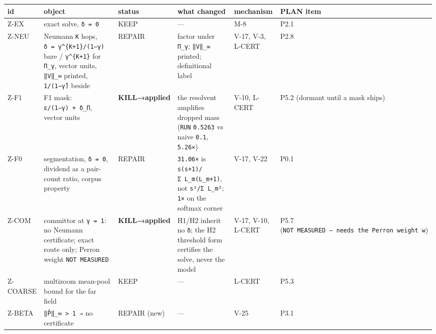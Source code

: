 \documentclass[11pt,a4paper]{article}
\newcounter{none}                 %
\theoremstyle{plain}
\theoremstyle{definition}
\theoremstyle{remark}
\begin{document}
{\def\LTcaptype{none} %
\begin{longtable}[]{@{}
  >{\raggedright\arraybackslash}p{}
  >{\raggedright\arraybackslash}p{}
  >{\raggedright\arraybackslash}p{}
  >{\raggedright\arraybackslash}p{}
  >{\raggedright\arraybackslash}p{}
  >{\raggedright\arraybackslash}p{}@{}}
\toprule\noalign{}
\begin{minipage}[b]{\linewidth}\raggedright
id
\end{minipage} & \begin{minipage}[b]{\linewidth}\raggedright
object
\end{minipage} & \begin{minipage}[b]{\linewidth}\raggedright
status
\end{minipage} & \begin{minipage}[b]{\linewidth}\raggedright
what changed
\end{minipage} & \begin{minipage}[b]{\linewidth}\raggedright
mechanism
\end{minipage} & \begin{minipage}[b]{\linewidth}\raggedright
PLAN item
\end{minipage} \\
\midrule\noalign{}
\endhead
\bottomrule\noalign{}
\endlastfoot
Z-EX & exact solve, \texttt{δ\ =\ 0} & KEEP & --- & M-8 & P2.1 \\
Z-NEU & Neumann \texttt{K} hops, \texttt{δ\ =\ γ\^{}\{K+1\}/(1−γ)} bare
/ \texttt{γ\^{}\{K+1\}} for \texttt{Π\_γ}, vector units, \texttt{‖V‖\_∞}
printed, \texttt{1/(1−γ̂)} beside & REPAIR & factor under \texttt{Π\_γ};
\texttt{‖V‖\_∞} printed; definitional label & V-17, V-3, L-CERT &
P2.8 \\
Z-F1 & F1 mask: \texttt{ε/(1−γ)\ +\ δ\_Π}, vector units &
\textbf{KILL→applied} & the resolvent amplifies dropped mass
(\texttt{RUN} \texttt{0.5263} vs naive \texttt{0.1}, \texttt{5.26×}) &
V-10, L-CERT & P5.2 (dormant until a mask ships) \\
Z-F0 & segmentation, \texttt{δ\ =\ 0}, dividend as a pair-count ratio,
corpus property & REPAIR & \texttt{31.06×} is
\texttt{s(s+1)/Σ\ L\_m(L\_m+1)}, not \texttt{s²/Σ\ L\_m²}; \texttt{1×}
on the softmax corner & V-17, V-22 & P0.1 \\
Z-COM & committor at \texttt{γ\ =\ 1}: no Neumann certificate; exact
route only; Perron weight \texttt{NOT\ MEASURED} & \textbf{KILL→applied}
& H1/H2 inherit no \texttt{δ}; the H2 threshold form certifies the
solve, never the model & V-17, V-10, L-CERT & P5.7
(\texttt{NOT\ MEASURED\ —\ needs\ the\ Perron\ weight\ w}) \\
Z-COARSE & multizoom mean-pool bound for the far field & KEEP & --- &
L-CERT & P5.3 \\
Z-BETA & \texttt{‖P̂‖\_∞\ \textgreater{}\ 1\ ⇒} no certificate & REPAIR
(new) & --- & V-25 & P3.1 \\
\end{longtable}
}
\end{document}
